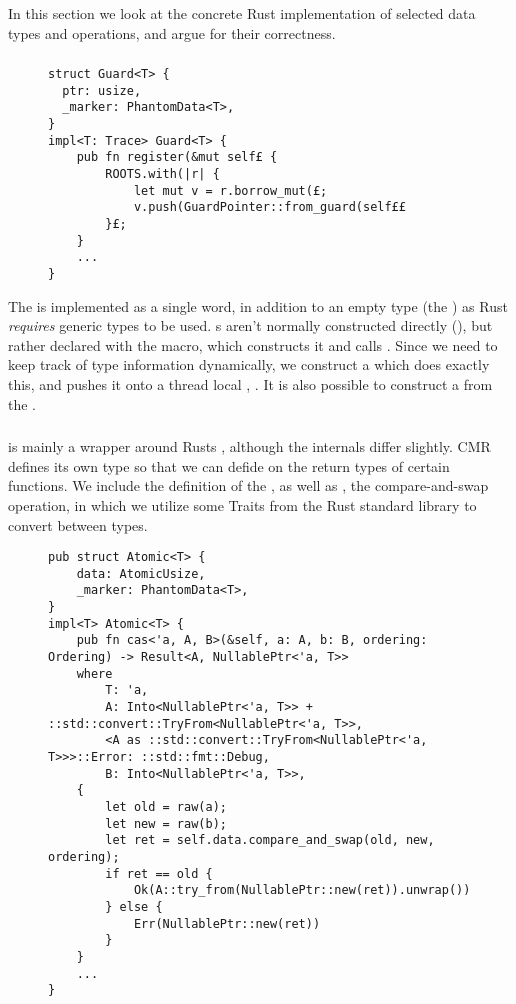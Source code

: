 In this section we look at the concrete Rust implementation of selected data types and operations,
and argue for their correctness.

\subsubsection{}

\begin{figure}[p]
  \begin{lstlisting}[caption=Excerpt of \mc{Guard}s definitions]
struct Guard<T> {
  ptr: usize,
  _marker: PhantomData<T>,
}
impl<T: Trace> Guard<T> {
    pub fn register(&mut self£ {
        ROOTS.with(|r| {
            let mut v = r.borrow_mut(£;
            v.push(GuardPointer::from_guard(self££
        }£;
    }
    ...
}\end{lstlisting}
\end{figure}

The  is implemented as a single word, in addition to an empty type (the
) as Rust \emph{requires} generic types to be used. s aren't normally
constructed directly (), but rather declared with the
 macro, which constructs it and calls . Since we need to keep
track of type information dynamically, we construct a  which does exactly this,
and pushes it onto a thread local , .
It is also possible to construct a  from the .

\subsubsection{}

 is mainly a wrapper around Rusts , although the internals differ
slightly. CMR defines its own type so that we can defide on the return types of certain functions.
We include the definition of the , as well as , the compare-and-swap
operation, in which we utilize some Traits from the Rust standard library to convert between types.

\begin{figure}[p]
  \begin{lstlisting}[caption=Excerpt of \mc{Atomic}s definitions]
pub struct Atomic<T> {
    data: AtomicUsize,
    _marker: PhantomData<T>,
}
impl<T> Atomic<T> {
    pub fn cas<'a, A, B>(&self, a: A, b: B, ordering: Ordering) -> Result<A, NullablePtr<'a, T>>
    where
        T: 'a,
        A: Into<NullablePtr<'a, T>> + ::std::convert::TryFrom<NullablePtr<'a, T>>,
        <A as ::std::convert::TryFrom<NullablePtr<'a, T>>>::Error: ::std::fmt::Debug,
        B: Into<NullablePtr<'a, T>>,
    {
        let old = raw(a);
        let new = raw(b);
        let ret = self.data.compare_and_swap(old, new, ordering);
        if ret == old {
            Ok(A::try_from(NullablePtr::new(ret)).unwrap())
        } else {
            Err(NullablePtr::new(ret))
        }
    }
    ...
}

\end{lstlisting}
\end{figure}

